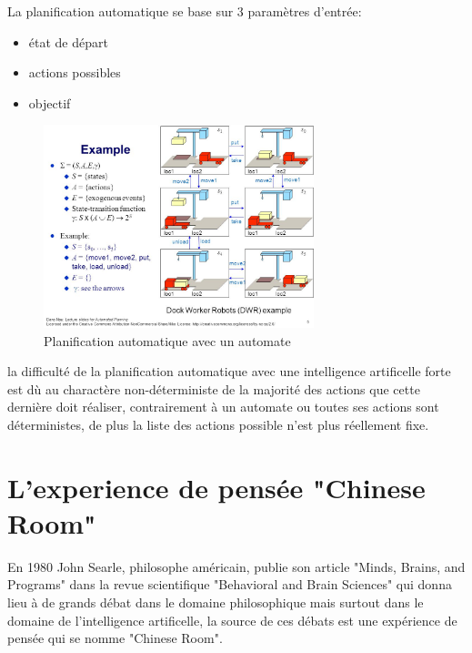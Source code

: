\begin{itemize}
    La planification automatique se base sur 3 paramètres d'entrée:
    \begin{itemize}
        \item état de départ
        \item actions possibles
        \item objectif \newline
    \end{itemize}

    \begin{figure}[H]
        \centering
        \includegraphics[width=0.7\textwidth]{Images/automatedPlanification}
        \caption{Planification automatique avec un automate}
        \label{fig:chineseroom}
    \end{figure}

    la difficulté de la planification automatique avec une intelligence artificelle forte est dù
    au charactère non-déterministe de la majorité des actions que cette dernière doit réaliser,
    contrairement à un automate ou toutes ses actions sont déterministes, de plus
    la liste des actions possible n'est plus réellement fixe. \newline
\end{itemize}

\section{L'experience de pensée "Chinese Room"}
En 1980 John Searle, philosophe américain, publie son article "Minds, Brains, and Programs" dans la revue
scientifique "Behavioral and Brain Sciences" qui donna lieu à de grands débat dans le domaine philosophique
mais surtout dans le domaine de l'intelligence artificelle,
la source de ces débats est une expérience de pensée qui se nomme "Chinese Room". \newline

